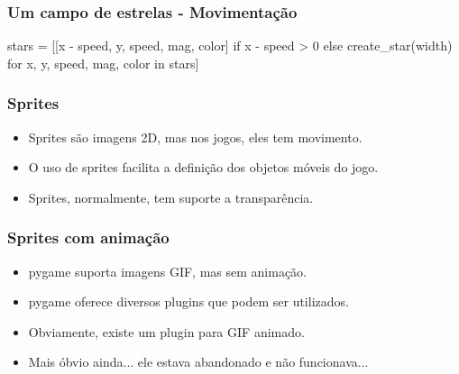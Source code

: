 \begin{frame}[fragile]
    \frametitle{Um campo de estrelas - Movimentação}

    \begin{python}
    stars = [[x - speed, y, speed, mag, color]
             if x - speed > 0
             else create_star(width)
             for x, y, speed, mag, color in stars]
    \end{python}
\end{frame}


\begin{frame}
    \frametitle{Sprites}

    \begin{itemize}
        \item Sprites são imagens 2D, mas nos jogos, eles tem movimento.
        \item O uso de sprites facilita a definição dos objetos móveis
        do jogo.
        \item Sprites, normalmente, tem suporte a transparência.
    \end{itemize}
\end{frame}


\begin{frame}
    \frametitle{Sprites com animação}

    \begin{itemize}
        \item pygame suporta imagens GIF, mas sem animação.
        \item pygame oferece diversos plugins que podem ser utilizados.
        \item Obviamente, existe um plugin para GIF animado.
        \item Mais óbvio ainda... ele estava abandonado e não funcionava...
    \end{itemize}
\end{frame}

